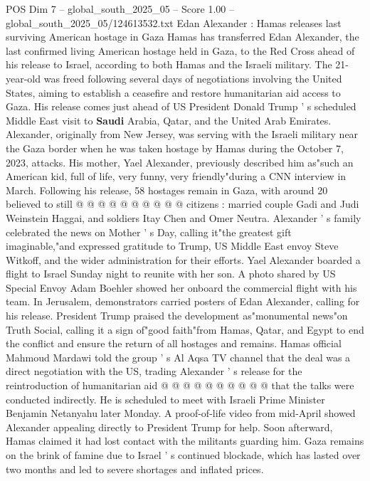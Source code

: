 \begin{textsample}{POS Dim 7 – global\_south\_2025\_05 – Score 1.00 – global\_south\_2025\_05/124613532.txt}  \label{ex:f7_pos_234}
Edan Alexander : Hamas releases last surviving American hostage in Gaza Hamas has transferred Edan Alexander, the last confirmed living American hostage held in Gaza, to the Red Cross ahead of his release to Israel, according to both Hamas and the Israeli military.
The 21-year-old was freed following several days of negotiations involving the United States, aiming to establish a ceasefire and restore humanitarian aid access to Gaza.
His release comes just ahead of US President Donald Trump ' s scheduled Middle East visit to \textbf{Saudi} Arabia, Qatar, and the United Arab Emirates.
Alexander, originally from New Jersey, was serving with the Israeli military near the Gaza border when he was taken hostage by Hamas during the October 7, 2023, attacks.
His mother, Yael Alexander, previously described him as"such an American kid, full of life, very funny, very friendly"during a CNN interview in March.
Following his release, 58 hostages remain in Gaza, with around 20 believed to still @ @ @ @ @ @ @ @ @ @ citizens : married couple Gadi and Judi Weinstein Haggai, and soldiers Itay Chen and Omer Neutra.
Alexander ' s family celebrated the news on Mother ' s Day, calling it"the greatest gift imaginable,"and expressed gratitude to Trump, US Middle East envoy Steve Witkoff, and the wider administration for their efforts.
Yael Alexander boarded a flight to Israel Sunday night to reunite with her son.
A photo shared by US Special Envoy Adam Boehler showed her onboard the commercial flight with his team.
In Jerusalem, demonstrators carried posters of Edan Alexander, calling for his release.
President Trump praised the development as"monumental news"on Truth Social, calling it a sign of"good faith"from Hamas, Qatar, and Egypt to end the conflict and ensure the return of all hostages and remains.
Hamas official Mahmoud Mardawi told the group ' s Al Aqsa TV channel that the deal was a direct negotiation with the US, trading Alexander ' s release for the reintroduction of humanitarian aid @ @ @ @ @ @ @ @ @ @ that the talks were conducted indirectly.
He is scheduled to meet with Israeli Prime Minister Benjamin Netanyahu later Monday.
A proof-of-life video from mid-April showed Alexander appealing directly to President Trump for help.
Soon afterward, Hamas claimed it had lost contact with the militants guarding him.
Gaza remains on the brink of famine due to Israel ' s continued blockade, which has lasted over two months and led to severe shortages and inflated prices.

\end{textsample}
